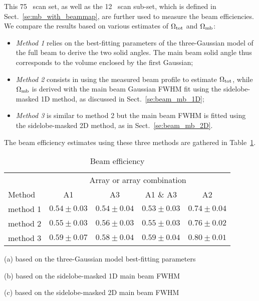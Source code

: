 This 75 \bm\ scan set, as well as the 12 \bm\ scan sub-set, which is
defined in Sect.~\ref{se:mb_with_beammap}, are further used to measure the beam
efficiencies. We compare the results based on various estimates of
$\Omega_{\rm{tot}}$ and $\Omega_{\rm{mb}}$:
\begin{itemize}
  \item{\emph{Method 1} relies on the best-fitting parameters of the
    three-Gaussian model of the full beam to derive the two solid
    angles. The main beam solid angle thus corresponds to the volume
    enclosed by the first Gaussian;}
  \item{\emph{Method 2} consists in using the measured beam profile to
    estimate $\Omega_{\rm{tot}}$, while $\Omega_{\rm{mb}}$ is derived
    with the main beam Gaussian FWHM fit using the sidelobe-masked 1D
    method, as discussed in Sect.~\ref{se:beam_mb_1D};}
  \item{\emph{Method 3} is similar to method 2 but the main beam FWHM is
    fitted using the sidelobe-masked 2D method, as in Sect.~\ref{se:beam_mb_2D}.}  
\end{itemize}

The beam efficiency estimates using these three methods are gathered
in Table~\ref{tab:beam_efficiency}.


\begin{table}[h]
  \caption[]{Beam efficiency}
  \centering
  \begin{threeparttable}
  \begin{tabular}{|l|c|c|c|c|}
    \hline
    
       &    \multicolumn{4}{|c|}{Array or array combination} \\
    \cline{2-5}
    Method & A1 &  A3 & A1 $\&$ A3 &  A2  \\
    \hline
    \hline
    method 1\tnote{a} &  $0.54 \pm 0.03$  & $0.54 \pm 0.04$  &  $0.53 \pm 0.03$  &  $0.74 \pm 0.04$  \\
    method 2\tnote{b} &  $0.55 \pm 0.03$  & $0.56 \pm 0.03$  &  $0.55 \pm 0.03$  &  $0.76 \pm 0.02$  \\
    method 3\tnote{c} &  $0.59 \pm 0.07$  & $0.58 \pm 0.04$  &  $0.59 \pm 0.04$  &  $0.80 \pm 0.01$  \\
    \hline
  \end{tabular}
  \begin{tablenotes}
  \item[(a)] \small{based on the three-Gaussian model best-fitting parameters}
  \item[(b)] \small{based on the sidelobe-masked 1D main beam FWHM} 
  \item[(c)] \small{based on the sidelobe-masked 2D main beam FWHM} 
  \end{tablenotes}
  \end{threeparttable}
  \label{tab:beam_efficiency}
\end{table}



